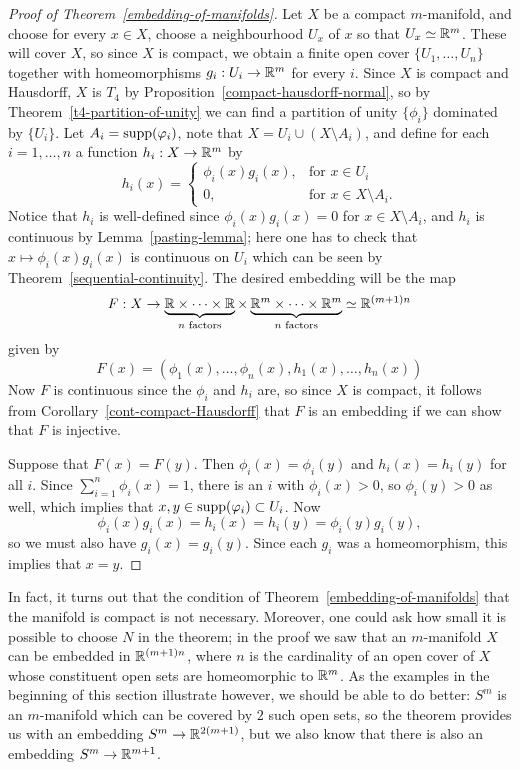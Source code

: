 \begin{proof}[Proof of Theorem~\ref{embedding-of-manifolds}]
  Let $X$ be a compact $m$-manifold, and choose for every $x \in X$, choose a neighbourhood $U_x$ of $x$ so that $U_x \simeq \mathbb{R}^m$. These will cover $X$, so since $X$ is compact, we obtain a finite open cover $\{U_1, \dots, U_n\}$ together with homeomorphisms $g_i : U_i \to \mathbb{R}^m$ for every $i$. Since $X$ is compact and Hausdorff, $X$ is $T_4$ by Proposition~\ref{compact-hausdorff-normal}, so by Theorem~\ref{t4-partition-of-unity} we can find a partition of unity $\{\phi_i\}$ dominated by $\{U_i\}$. Let $A_i = \operatorname{supp}(\varphi_i)$, note that $X = U_i \cup (X \setminus A_i)$, and define for each $i = 1, \dots, n$ a function $h_i : X \to \mathbb{R}^m$ by
  \[
    h_i(x) = \begin{cases} \phi_i(x)g_i(x), & \text{for $x \in U_i$} \\ 0, & \text{for $x \in X \setminus A_i$.} \end{cases}
  \]
  Notice that $h_i$ is well-defined since $\phi_i(x)g_i(x) = 0$ for $x \in X \setminus A_i$, and $h_i$ is continuous by Lemma~\ref{pasting-lemma}; here one has to check that $x \mapsto \phi_i(x)g_i(x)$ is continuous on $U_i$ which can be seen by Theorem~\ref{sequential-continuity}. The desired embedding will be the map
  \[
    F : X \to \underbrace{\mathbb{R} \times \cdots \times \mathbb{R}}_{\text{$n$ factors}} \times \underbrace{\mathbb{R}^m \times \cdots \times \mathbb{R}^m}_{\text{$n$ factors}} \simeq \mathbb{R}^{(m+1)n}
  \]
  given by
  \[
    F(x) = (\phi_1(x),\dots,\phi_n(x),h_1(x),\dots,h_n(x))
  \]
  Now $F$ is continuous since the $\phi_i$ and $h_i$ are, so since $X$ is compact, it follows from Corollary~\ref{cont-compact-Hausdorff} that $F$ is an embedding if we can show that $F$ is injective.
  
  Suppose that $F(x) = F(y)$. Then $\phi_i(x) = \phi_i(y)$ and $h_i(x) = h_i(y)$ for all $i$. Since $\sum_{i=1}^n \phi_i(x) = 1$, there is an $i$ with $\phi_i(x) > 0$, so $\phi_i(y) > 0$ as well, which implies that $x, y \in \operatorname{supp}(\varphi_i) \subset U_i$. Now
  \[
    \phi_i(x) g_i(x) = h_i(x) = h_i(y) = \phi_i(y) g_i(y),
  \]
  so we must also have $g_i(x) = g_i(y)$. Since each $g_i$ was a homeomorphism, this implies that $x = y$.
\end{proof}

In fact, it turns out that the condition of Theorem~\ref{embedding-of-manifolds} that the manifold is compact is not necessary. Moreover, one could ask how small it is possible to choose $N$ in the theorem; in the proof we saw that an $m$-manifold $X$ can be embedded in $\mathbb{R}^{(m+1)n}$, where $n$ is the cardinality of an open cover of $X$ whose constituent open sets are homeomorphic to $\mathbb{R}^m$. As the examples in the beginning of this section illustrate however, we should be able to do better: $S^m$ is an $m$-manifold which can be covered by $2$ such open sets, so the theorem provides us with an embedding $S^m \to \mathbb{R}^{2(m+1)}$, but we also know that there is also an embedding $S^m \to \mathbb{R}^{m+1}$.

